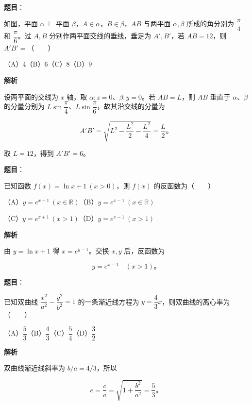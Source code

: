 \begin{answer}

\textbf{题目}：

如图，平面 $\alpha\perp$ 平面 $\beta$，$A\in\alpha$，$B\in\beta$，$AB$ 与两平面 $\alpha,\beta$ 所成的角分别为 $\dfrac\pi4$ 和 $\dfrac\pi6$。过 $A,B$ 分别作两平面交线的垂线，垂足为 $A',B'$，若 $AB=12$，则 $A'B'=$\mbox{（　　）}
\nopagebreak[4]
\begin{center}\end{center}
\nopagebreak[4]
（A）$4$\quad（B）$6$\quad（C）$8$\quad（D）$9$

\textbf{解析}

设两平面的交线为 $x$ 轴，取 $\alpha:z=0$、$\beta:y=0$。若 $AB=L$，则 $AB$ 垂直于 $\alpha$、$\beta$ 的分量分别为 $L\sin\dfrac\pi4$、$L\sin\dfrac\pi6$，故其沿交线的分量为

\nopagebreak[4]
\[
A'B'=\sqrt{L^2-\frac{L^2}{2}-\frac{L^2}{4}}=\frac L2\text{。}
\]

取 $L=12$，得到 $A'B'=6$。


\end{answer}
\begin{answer}

\textbf{题目}：

已知函数 $f(x)=\ln x+1\ (x>0)$，则 $f(x)$ 的反函数为\mbox{（　　）}

（A）$y=e^{x+1}\ (x\in\mathbb R)$\quad（B）$y=e^{x-1}\ (x\in\mathbb R)$

（C）$y=e^{x+1}\ (x>1)$\quad（D）$y=e^{x-1}\ (x>1)$

\textbf{解析}

由 $y=\ln x+1$ 得 $x=e^{y-1}$。交换 $x,y$ 后，反函数为

\nopagebreak[4]
\[
y=e^{x-1}\quad(x>1)\text{。}
\]


\end{answer}
\begin{answer}

\textbf{题目}：

已知双曲线 $\dfrac{x^2}{a^2}-\dfrac{y^2}{b^2}=1$ 的一条渐近线方程为 $y=\dfrac43x$，则双曲线的离心率为\mbox{（　　）}

（A）$\dfrac53$\quad（B）$\dfrac43$\quad（C）$\dfrac54$\quad（D）$\dfrac32$

\textbf{解析}

双曲线渐近线斜率为 $b/a=4/3$，所以

\nopagebreak[4]
\[
e=\frac ca=\sqrt{1+\frac{b^2}{a^2}}=\frac53\text{。}
\]


\end{answer}
